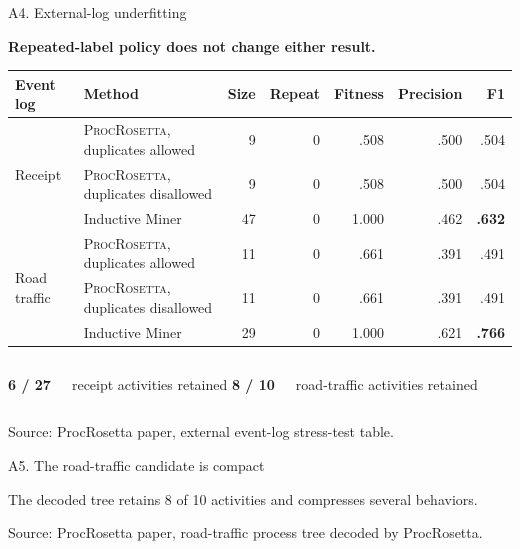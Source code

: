 \documentclass[aspectratio=169,12pt]{beamer}
\newcommand{\model}{\textsc{ProcRosetta}\xspace}
\newcommand{\best}[1]{\textbf{#1}}
\newcommand{\paperfigure}[1]{%
  \begingroup
  \newenvironment{figure*}[1][]{\par\centering}{\par}
  \renewcommand{\caption}[1]{}
  \renewcommand{\label}[1]{}
  
  \endgroup
}
\newcommand{\source}[1]{\vfill{\tiny\color{prgray}Source: #1\par}}
\newcommand{\keyline}[1]{%
  \begin{center}
  \colorbox{prlightteal}{\parbox{0.91\textwidth}{\centering\bfseries\color{prnavy}#1}}
  \end{center}
}
\begin{document}
\begin{frame}[t]{A4. External-log underfitting}
  \vspace{0mm}
  \keyline{Repeated-label policy does not change either result.}
  \vspace{2mm}
  \centering
  \scriptsize
  \renewcommand{\arraystretch}{1.10}
  \setlength{\tabcolsep}{3.5pt}
  \begin{tabular}{@{}llrrrrr@{}}
    \toprule
    Event log & Method & Size & Repeat & Fitness & Precision & F1 \\
    \midrule
    \multirow{3}{*}{Receipt}
      & \model, duplicates allowed & 9 & 0 & .508 & .500 & .504 \\
      & \model, duplicates disallowed & 9 & 0 & .508 & .500 & .504 \\
      & Inductive Miner & 47 & 0 & 1.000 & .462 & \best{.632} \\
    \midrule
    \multirow{3}{*}{Road traffic}
      & \model, duplicates allowed & 11 & 0 & .661 & .391 & .491 \\
      & \model, duplicates disallowed & 11 & 0 & .661 & .391 & .491 \\
      & Inductive Miner & 29 & 0 & 1.000 & .621 & \best{.766} \\
    \bottomrule
  \end{tabular}
  \par\vspace{1mm}
  \begin{columns}[c,onlytextwidth]
      {\fontsize{21}{24}\selectfont\bfseries\color{prred}6 / 27}\par
      \small receipt activities retained
      {\fontsize{21}{24}\selectfont\bfseries\color{prgold}8 / 10}\par
      \small road-traffic activities retained
  \end{columns}
  \source{ProcRosetta paper, external event-log stress-test table.}
\end{frame}

\begin{frame}[t]{A5. The road-traffic candidate is compact}
  \vspace{-2mm}
  \paperfigure{figures/real-log-tree}
  \vspace{-2mm}
  \centering\small The decoded tree retains 8 of 10 activities and compresses several behaviors.
  \source{ProcRosetta paper, road-traffic process tree decoded by ProcRosetta.}
\end{frame}
\end{document}
